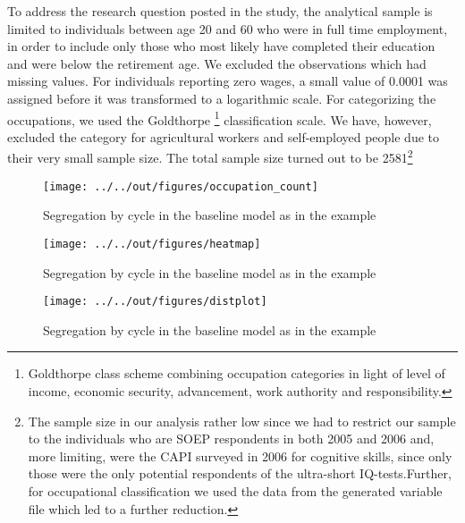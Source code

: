 \documentclass[11pt, a4paper, leqno]{article}
\begin{document}
To address the research question posted in the study, the analytical sample is limited to individuals between age 20 and 60  who were in full time employment, in order to include only those who most likely have completed their education and were below the retirement age. We excluded the observations which had missing values. For individuals reporting zero wages, a small value of 0.0001 was assigned before it was transformed to a logarithmic scale. For categorizing the occupations, we used the  Goldthorpe \footnote{ Goldthorpe class scheme combining occupation categories in light of level of income, economic security, advancement, work authority and responsibility.  
} classification scale.  We have, however,  excluded the category for  agricultural workers and self-employed people due to their very small sample size. The total sample size turned out to be 2581\footnote{The sample size in our analysis rather low since we had to restrict our sample to the  individuals who are SOEP respondents in both 2005 and 2006 and, more limiting, were the CAPI surveyed in 2006 for cognitive skills, since only those were the only potential respondents of the ultra-short IQ-tests.Further, for occupational classification we used the data from the generated variable file which led to a further reduction.}


\begin{figure}
    \caption{Segregation by cycle in the baseline \citet{Schelling69} model as in the \citet{StachurskiSargent13} example}
    
    \texttt{[image: ../../out/figures/occupation\_count]}

\end{figure}

\begin{figure}
    \caption{Segregation by cycle in the baseline \citet{Schelling69} model as in the \citet{StachurskiSargent13} example}
    
    \texttt{[image: ../../out/figures/heatmap]}

\end{figure}

\begin{figure}
    \caption{Segregation by cycle in the baseline \citet{Schelling69} model as in the \citet{StachurskiSargent13} example}
    
    \texttt{[image: ../../out/figures/distplot]}

\end{figure}
\end{document}
